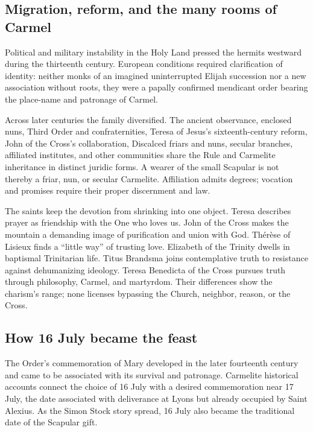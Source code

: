 \subsection{Migration, reform, and the many rooms of Carmel}

Political and military instability in the Holy Land pressed the hermits westward during the thirteenth century. European conditions required clarification of identity: neither monks of an imagined uninterrupted Elijah succession nor a new association without roots, they were a papally confirmed mendicant order bearing the place-name and patronage of Carmel.

Across later centuries the family diversified. The ancient observance, enclosed nuns, Third Order and confraternities, Teresa of Jesus's sixteenth-century reform, John of the Cross's collaboration, Discalced friars and nuns, secular branches, affiliated institutes, and other communities share the Rule and Carmelite inheritance in distinct juridic forms. A wearer of the small Scapular is not thereby a friar, nun, or secular Carmelite. Affiliation admits degrees; vocation and promises require their proper discernment and law.

The saints keep the devotion from shrinking into one object. Teresa describes prayer as friendship with the One who loves us. John of the Cross makes the mountain a demanding image of purification and union with God. Thérèse of Lisieux finds a ``little way'' of trusting love. Elizabeth of the Trinity dwells in baptismal Trinitarian life. Titus Brandsma joins contemplative truth to resistance against dehumanizing ideology. Teresa Benedicta of the Cross pursues truth through philosophy, Carmel, and martyrdom. Their differences show the charism's range; none licenses bypassing the Church, neighbor, reason, or the Cross.

\subsection{How 16 July became the feast}

The Order's commemoration of Mary developed in the later fourteenth century and came to be associated with its survival and patronage. Carmelite historical accounts connect the choice of 16 July with a desired commemoration near 17 July, the date associated with deliverance at Lyons but already occupied by Saint Alexius. As the Simon Stock story spread, 16 July also became the traditional date of the Scapular gift.

